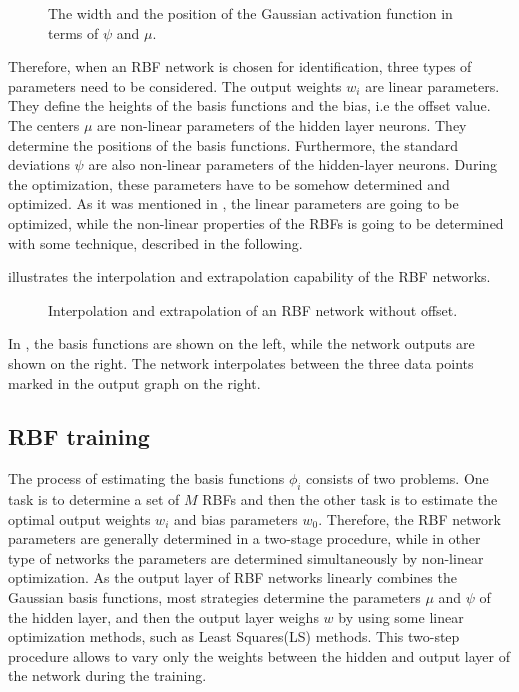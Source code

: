 \begin{figure}[H]
\centering
 
\caption{The width and the position of the Gaussian activation function in terms of $\psi$ and $\mu$.}
\label{fig:rbf_pram}
\end{figure}

\vspace{-3mm}

Therefore, when an RBF network is chosen for identification, three types of parameters need to be considered. The output weights $w_i$ are linear parameters. They define the heights of the basis functions and the bias, i.e the offset value. The centers $\mu$ are non-linear parameters of the hidden layer neurons. They determine the positions of the basis functions. Furthermore, the standard deviations $\psi$ are also non-linear parameters of the hidden-layer neurons. During the optimization, these parameters have to be somehow determined and optimized. As it was mentioned in , the linear parameters are going to be optimized, while the non-linear properties of the RBFs is going to be determined with some technique, described in the following. 

 illustrates the interpolation and extrapolation capability of the RBF networks. 

\begin{figure}[H]
\centering
 
\caption{Interpolation and extrapolation of an RBF network without offset.}
\label{fig:rbf_interpol}
\end{figure}

\vspace{-3mm}

In , the basis functions are shown on the left, while the network outputs are shown on the right. The network interpolates  between the three data points marked in the output graph on the right. 

\subsection{RBF training}
\label{RBF_training}

The process of estimating the basis functions $\phi_i$ consists of two problems. One task is to determine a set of $M$ RBFs and then the other task is to estimate the optimal output weights $w_i$ and bias parameters $w_0$. Therefore, the RBF network parameters are generally determined in a two-stage procedure, while in other type of networks the parameters are determined simultaneously by non-linear optimization\cite{RBF_article}. As the output layer of RBF networks linearly combines the Gaussian basis functions, most strategies determine the parameters $\mu$ and $\psi$ of the hidden layer, and then the output layer weighs $w$ by using some linear optimization methods, such as Least Squares(LS) methods. This two-step procedure allows to vary only the weights between the hidden and output layer of the network during the training. 

